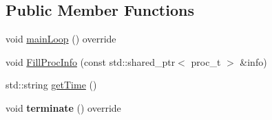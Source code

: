 \subsection*{Public Member Functions}
\begin{DoxyCompactItemize}
\item 
void \hyperlink{structProcessInfoModule_a66f1ebb4d2179c7ceb5798fd1c81bc27}{main\+Loop} () override
\item 
void \hyperlink{structProcessInfoModule_a85e87f2c7a75ada7b23e8a672b06c75a}{Fill\+Proc\+Info} (const std\+::shared\+\_\+ptr$<$ proc\+\_\+t $>$ \&info)
\item 
std\+::string \hyperlink{structProcessInfoModule_ada9eaa0787b9c5b393450c321e8941a7}{get\+Time} ()
\item 
void {\bfseries terminate} () override\hypertarget{structProcessInfoModule_a4949333ed2abc7e07933dda2c1f8cf7e}{}\label{structProcessInfoModule_a4949333ed2abc7e07933dda2c1f8cf7e}

\end{DoxyCompactItemize}
